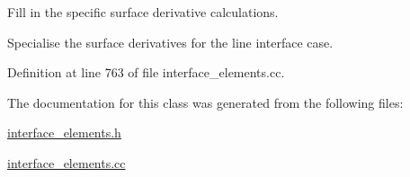 Fill in the specific surface derivative calculations. 

Specialise the surface derivatives for the line interface case. 

Definition at line 763 of file interface\+\_\+elements.\+cc.



The documentation for this class was generated from the following files\+:\begin{DoxyCompactItemize}
\item 
\hyperlink{interface__elements_8h}{interface\+\_\+elements.\+h}\item 
\hyperlink{interface__elements_8cc}{interface\+\_\+elements.\+cc}\end{DoxyCompactItemize}
